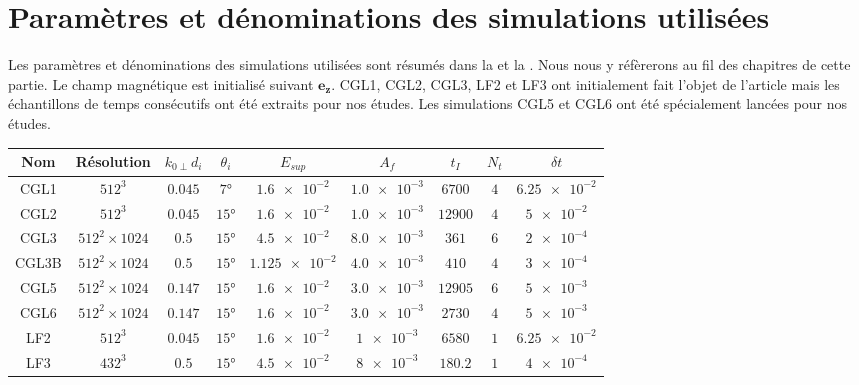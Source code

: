 \newpage

\section*{Paramètres et dénominations des simulations utilisées}
Les paramètres et dénominations des simulations utilisées sont résumés dans la  et la . Nous nous y réfèrerons au fil des chapitres de cette partie. Le champ magnétique est initialisé suivant $\boldsymbol{e_z}$. CGL1, CGL2, CGL3, LF2 et LF3 ont initialement fait l'objet de l'article \cite{ferrand_fluid_2021} mais les échantillons de temps consécutifs ont été extraits pour nos études. Les simulations CGL5 et CGL6 ont été spécialement lancées pour nos études.

 \begin{table}[!ht]
\begin{center}
\begin{tabular}{ c|c|c|c|c|c|c|c|c } 
Nom & Résolution & $k_{0 \perp}d_i$ & $\theta_i$ & $E_{sup}$ &  $A_f$ & $t_I$ & $N_t$ & $\delta t$  \\
\hline
CGL1 & $512^3$ & $\num{0.045}$ & $\ang{7}$ & $\num{1.6e-2}$ & $\num{1.0e-3}$ & $\num{6700}$ & $\num{4}$ & $\num{6.25e-2}$\\
CGL2  & $512^3$ & $\num{0.045}$ & $\ang{15}$ & $\num{1.6e-2}$& $\num{1.0e-3}$ & $\num{12900}$ & $\num{4}$ & $\num{5e-2}$ \\
CGL3 & $512^2 \times 1024$ & $\num{0.5}$ & $\ang{15}$ &  $\num{4.5e-2}$& $\num{8.0e-3}$ & $\num{361}$&$\num{6}$ & $\num{2e-4}$ \\
CGL3B & $512^2 \times 1024$ & $\num{0.5}$ & $\ang{15}$ &  $\num{1.125e-2}$ &$\num{4.0e-3}$ & $\num{410}$ & $\num{4}$ & $\num{3e-4}$ \\
CGL5 & $512^2 \times 1024$ & $\num{0.147}$ & $\ang{15}$ & $\num{1.6e-2}$ &$\num{3.0e-3}$  &$\num{12905}$ & $\num{6}$ & $\num{5e-3}$ \\
CGL6 & $512^2 \times 1024$ & $\num{0.147}$ & $\ang{15}$ & $\num{1.6e-2}$ &$\num{3.0e-3}$  &$\num{2730}$ & $\num{4}$ & $\num{5e-3}$\\
\hline
LF2  & $512^3$ & $\num{0.045}$ & $\ang{15}$ & $\num{1.6e-2}$ & $\num{1e-3}$ & $\num{6580}$ &  $\num{1}$ & $\num{6.25e-2}$  \\
LF3 & $432^3$ & $\num{0.5}$ & $\ang{15}$ & $\num{4.5e-2}$ & $\num{8e-3}$ &$\num{180.2}$  &  $\num{1}$ & $\num{4e-4}$  \\
\end{tabular}


\end{center}
\end{table}
